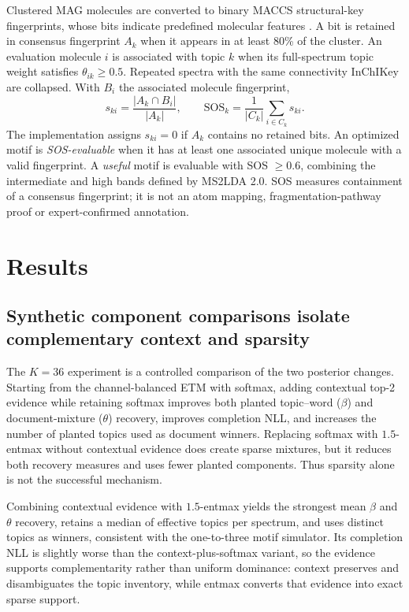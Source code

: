 \documentclass[10pt,a4paper]{article}
\begin{document}
Clustered MAG molecules are converted to binary MACCS structural-key
fingerprints, whose bits indicate predefined molecular features
\cite{durant2002}. A bit is retained in consensus fingerprint $A_k$ when it
appears in at least 80\% of the cluster. An evaluation molecule $i$ is associated
with topic $k$ when its full-spectrum topic weight satisfies
$\theta_{ik}\geq0.5$. Repeated spectra with the same connectivity InChIKey are
collapsed. With $B_i$ the associated molecule fingerprint,
\begin{equation}
  s_{ki}=\frac{|A_k\cap B_i|}{|A_k|},\qquad
  \mathrm{SOS}_k=\frac1{|C_k|}\sum_{i\in C_k}s_{ki}.
  \label{eq:sos}
\end{equation}
The implementation assigns $s_{ki}=0$ if $A_k$ contains no retained bits.
An optimized motif is \emph{SOS-evaluable} when it has at least one associated
unique molecule with a valid fingerprint. A \emph{useful} motif is evaluable
with SOS $\geq0.6$, combining the intermediate and high bands defined by
MS2LDA 2.0. SOS measures containment of a consensus fingerprint; it is not an
atom mapping, fragmentation-pathway proof or expert-confirmed annotation.

\section{Results}

\subsection{Synthetic component comparisons isolate complementary context and sparsity}

The $K=36$ experiment is a controlled comparison of the two posterior changes.
Starting from the channel-balanced ETM with softmax, adding contextual top-2
evidence while retaining softmax improves both planted topic--word ($\beta$) and
document-mixture ($\theta$) recovery, improves completion NLL, and increases the
number of planted topics used as document winners. Replacing softmax with
$1.5$-entmax without contextual evidence does create sparse mixtures, but it
reduces both recovery measures and uses fewer planted components. Thus sparsity
alone is not the successful mechanism.

Combining contextual evidence with $1.5$-entmax yields the strongest mean
$\beta$ and $\theta$ recovery, retains a median of
\SyntheticContextualMedianEffective{} effective topics per spectrum, and uses
\SyntheticContextualUniqueTopOne{} distinct topics as winners, consistent with the
one-to-three motif simulator. Its completion NLL is slightly worse than the
context-plus-softmax variant, so the evidence supports complementarity rather
than uniform dominance: context preserves and disambiguates the topic inventory,
while entmax converts that evidence into exact sparse support.
\end{document}
